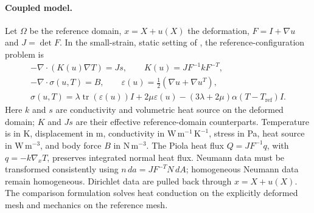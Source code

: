 \paragraph{Coupled model.}
Let $\Omega$ be the reference domain, $x=X+u(X)$ the deformation,
$F=I+\nabla u$ and $J=\det F$. In the small-strain, static setting of
, the reference-configuration problem is
\begin{gather}
 -\nabla\cdot(K(u)\nabla T)=J s,
 \qquad K(u)=JF^{-1}kF^{-T},\label{eq:app:thermomeca:heat}\\
 -\nabla\cdot\sigma(u,T)=B,
 \qquad\varepsilon(u)=\tfrac12(\nabla u+\nabla u^T),\label{eq:app:thermomeca:mechanics}\\
 \sigma(u,T)=\lambda\operatorname{tr}(\varepsilon(u))I
 +2\mu\varepsilon(u)-(3\lambda+2\mu)\alpha(T-T_{\mathrm{ref}})I.
 \label{eq:app:thermomeca:stress}
\end{gather}
Here $k$ and $s$ are conductivity and volumetric heat source on the deformed
domain; $K$ and $Js$ are their effective reference-domain counterparts.
Temperature is in K, displacement in m, conductivity in
$\mathrm{W\,m^{-1}\,K^{-1}}$, stress in Pa, heat source in
$\mathrm{W\,m^{-3}}$, and body force $B$ in $\mathrm{N\,m^{-3}}$.
The Piola heat flux $Q=JF^{-1}q$, with $q=-k\nabla_xT$, preserves integrated
normal heat flux. Neumann data must be transformed consistently using
$n\,da=JF^{-T}N\,dA$; homogeneous Neumann data remain homogeneous.
Dirichlet data are pulled back through $x=X+u(X)$.
The comparison formulation solves heat conduction on the explicitly deformed
mesh and mechanics on the reference mesh.

